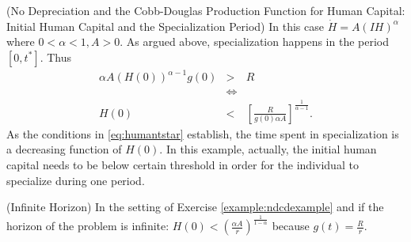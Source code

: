 \begin{example} (No Depreciation and the Cobb-Douglas Production Function for Human Capital: Initial Human Capital and the Specialization Period) \label{example:ndcdexample}
In this case $\dot{H} = A \left(IH \right)^\alpha$ where $0 < \alpha < 1, A>0$. As argued above, specialization happens in the period $[0,t^*]$. Thus
\begin{eqnarray}
	\alpha A \left( H(0) \right) ^{\alpha - 1 }g(0) &>& R \nonumber \\
	&\Leftrightarrow& \nonumber \\
	H(0) &<& \left[ \frac{R}{g(0)\alpha A} \right]^{\frac{1}{\alpha-1}} \label{eq:h0forspe}.
\end{eqnarray}
\indent As the conditions in \eqref{eq:humantstar} establish, the time spent in specialization is a decreasing function of $H(0)$. In this example, actually, the initial human capital needs to be below certain threshold in order for the individual to specialize during one period. 
\end{example}

\begin{example} (Infinite Horizon)
In the setting of Exercise \ref{example:ndcdexample} and if the horizon of the problem is infinite: $H(0) < \left( \frac{\alpha A}{r} \right) ^{\frac{1}{1 - \alpha}}$ because $g(t) = \frac{R}{r}$.
\end{example}

